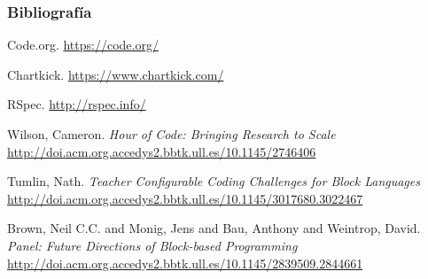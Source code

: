 \documentclass{beamer}
\begin{document}
\begin{frame}[allowframebreaks]
  \frametitle{Bibliografía}

  \begin{thebibliography}{10}

    \beamertemplatebookbibitems
    Code.org. {\small{\url{https://code.org/}}}

    \beamertemplatebookbibitems
    Chartkick. {\small{\url{https://www.chartkick.com/}}}

    \beamertemplatebookbibitems
    RSpec. {\small{\url{http://rspec.info/}}}

    \beamertemplatebookbibitems
    Wilson, Cameron. 
    \emph{Hour of Code: Bringing Research to Scale} 
    {\small{\url{http://doi.acm.org.accedys2.bbtk.ull.es/10.1145/2746406}}}

    \beamertemplatebookbibitems
    Tumlin, Nath. 
    \emph{Teacher Configurable Coding Challenges for Block Languages} 
    {\small{\url{http://doi.acm.org.accedys2.bbtk.ull.es/10.1145/3017680.3022467}}}

    \beamertemplatebookbibitems
    Brown, Neil C.C. and Monig, Jens and Bau, Anthony and Weintrop, David. 
    \emph{Panel: Future Directions of Block-based Programming} 
    {\small{\url{http://doi.acm.org.accedys2.bbtk.ull.es/10.1145/2839509.2844661}}}


  \end{thebibliography}
\end{frame}


\end{document}
